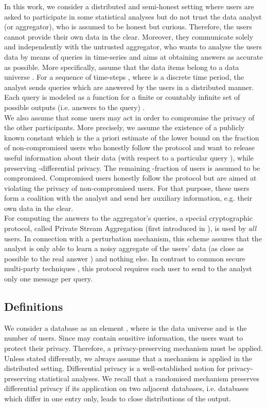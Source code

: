 \documentclass[10pt]{extarticle}
\begin{document}
In this work, we consider a distributed and semi-honest setting where  users are asked to participate in some statistical analyses but do not trust the data analyst (or aggregator), who is assumed to be honest but curious. Therefore, the users cannot provide their own data in the clear. Moreover, they communicate solely and independently with the untrusted aggregator, who wants to analyse the users data by means of queries in time-series and aims at obtaining answers as accurate as possible. More specifically, assume that the data items belong to a data universe . For a sequence of time-steps , where  is a discrete time period, the analyst sends queries which are answered by the users in a distributed manner. Each query is modeled as a function  for a finite or countably infinite set of possible outputs (i.e. answers to the query) .\\ 
We also assume that some users may act in order to compromise the privacy of the other participants. More precisely, we assume the existence of a publicly known constant  which is the a priori estimate of the lower bound on the fraction 
of non-compromised users who honestly follow the protocol and want to release useful information about their data (with respect to a particular query ), while preserving -differential privacy. 
The remaining -fraction of users is assumed to be compromised. Compromised users honestly follow the protocol but are aimed at violating the privacy of non-compromised users.
For that purpose, these users form a coalition with the analyst and send her auxiliary information, e.g. their own data in the clear.\\ For computing the answers to the aggregator's queries, a special cryptographic protocol, called Private Stream Aggregation (first introduced in \cite{2}), is used by \textit{all} users. In connection with a perturbation mechanism, this scheme assures that the analyst is only able to learn a noisy aggregate of the users' data (as close as possible to the real answer ) and nothing else. In contrast to common secure multi-party techniques \cite{25, 6, 20}, this protocol requires each user to send to the analyst only one message per query. 

\subsection{Definitions}

We consider a database as an element , where  is the data universe and  is the number of users. Since  may contain sensitive information, the users want to protect their privacy. Therefore, a privacy-preserving mechanism must be applied. Unless stated differently, we always assume that a mechanism is applied in the distributed setting. Differential privacy \cite{8} is a well-established notion for privacy-preserving statistical analyses. We recall that a randomised mechanism preserves differential privacy if its application on two adjacent databases, i.e. databases which differ in one entry only, leads to close distributions of the output.
\end{document}
